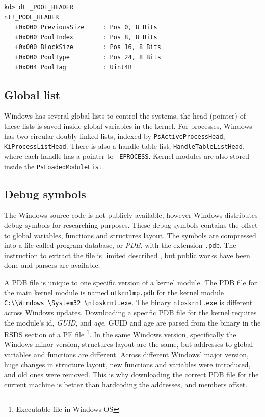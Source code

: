 \begin{lstlisting}[language=windbg,caption=\texttt{\_POOL\_HEADER} in Windows 64-bit,float,floatplacement=H]
kd> dt _POOL_HEADER
nt!_POOL_HEADER
   +0x000 PreviousSize     : Pos 0, 8 Bits
   +0x000 PoolIndex        : Pos 8, 8 Bits
   +0x000 BlockSize        : Pos 16, 8 Bits
   +0x000 PoolType         : Pos 24, 8 Bits
   +0x004 PoolTag          : Uint4B
\end{lstlisting}

\subsection[Global list]{Global list}

Windows has several global lists to control the systems, the head (pointer) of
these lists is saved inside global variables in the kernel. For processes,
Windows has two circular doubly linked lists, indexed by
\texttt{PsActiveProcessHead}, \texttt{KiProcessListHead}.  There is also a
handle table list, \texttt{HandleTableListHead}, where each handle has a
pointer to \texttt{\_EPROCESS}. Kernel modules are also stored inside the
\texttt{PsLoadedModuleList}.

\subsection[Debug symbols]{Debug symbols}

The Windows source code is not publicly available, however Windows distributes
debug symbols for researching purposes. These debug symbols contains the offset
to global variables, functions and structures layout. The symbols are compressed
into a file called program database, or \textit{PDB}, with the extension
\texttt{.pdb}. The instruction to extract the file is limited described
\cite{microsoft-pdb}, but public works have been done and parsers are
available.

A PDB file is unique to one specific version of a kernel module. The PDB file
for the main kernel module is named \texttt{ntkrnlmp.pdb} for the kernel module
\texttt{C:\textbackslash \textbackslash Windows \textbackslash System32
\textbackslash ntoskrnl.exe}. The binary \texttt{ntoskrnl.exe} is different
across Windows updates. Downloading a specific PDB file for the kernel requires
the module's id, \textit{GUID}, and \textit{age}. GUID and age are parsed from
the binary in the RSDS section of a PE file \footnote{Executable file in
Windows OS}. In the same Windows version, specifically the Windows minor
version, structures layout are the same, but addresses to global variables and
functions are different.  Across different Windows' major version, huge changes
in structure layout, new functions and variables were introduced, and old ones
were removed. This is why downloading the correct PDB file for the current
machine is better than hardcoding the addresses, and members offset.

